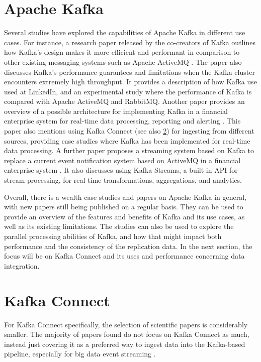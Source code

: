 \section{Apache Kafka}
Several studies have explored the capabilities of Apache Kafka in different use cases. For instance, a research paper released by the co-creators of Kafka outlines how Kafka's design makes it more efficient and performant in comparison to other existing messaging systems such as Apache ActiveMQ \cite{kreps2011kafka}. The paper also discusses Kafka's performance guarantees and limitations when the Kafka cluster encounters extremely high throughput. It provides a description of how Kafka use used at LinkedIn, and an experimental study where the performance of Kafka is compared with Apache ActiveMQ and RabbitMQ. Another paper provides an overview of a possible architecture for implementing Kafka in a financial enterprise system for real-time data processing, reporting and alerting \cite{peddireddystreamliningprocessingkafka}. This paper also mentions using Kafka Connect (see also \ref{ch03:litreview:kafkaconnect}) for ingesting from different sources, providing case studies where Kafka has been implemented for real-time data processing. A further paper proposes a streaming system based on Kafka to replace a current event notification system based on ActiveMQ in a financial enterprise system \cite{sanjanaenterprise}. It also discusses using Kafka Streams, a built-in API for stream processing, for real-time transformations, aggregations, and analytics.

Overall, there is a wealth case studies and papers on Apache Kafka in general, with new papers still being published on a regular basis. They can be used to provide an overview of the features and benefits of Kafka and its use cases, as well as its existing limitations. The studies can also be used to explore the parallel processing abilities of Kafka, and how that might impact both performance and the consistency of the replication data. In the next section, the focus will be on Kafka Connect and its uses and performance concerning data integration.

\section{Kafka Connect}
\label{ch03:litreview:kafkaconnect}
For Kafka Connect specifically, the selection of scientific papers is considerably smaller. The majority of papers found do not focus on Kafka Connect as much, instead just covering it as a preferred way to ingest data into the Kafka-based pipeline, especially for big data event streaming \cite{padmanabankafkabigdataeventstreaming}.

